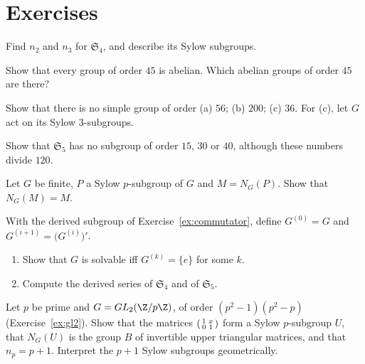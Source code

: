 \section{Exercises}

\begin{exercise}[$\star$]\label{ex:sylowS4}
Find $n_2$ and $n_3$ for $\mathfrak S_4$, and describe its Sylow subgroups.
\end{exercise}

\begin{exercise}[$\star$]\label{ex:order45}
Show that every group of order $45$ is abelian. Which abelian groups of order $45$ are there?
\end{exercise}

\begin{exercise}[$\star$]\label{ex:nosimple}
Show that there is no simple group of order (a) $56$; (b) $200$; (c) $36$. For (c), let $G$ act on its Sylow $3$-subgroups.
\end{exercise}

\begin{exercise}[$\star\star$]\label{ex:S5sub}
Show that $\mathfrak S_5$ has no subgroup of order $15$, $30$ or $40$, although these numbers divide $120$.
\end{exercise}

\begin{exercise}[$\star\star$]\label{ex:normalizer}
Let $G$ be finite, $P$ a Sylow $p$-subgroup of $G$ and $M=N_G(P)$. Show that $N_G(M)=M$.
\end{exercise}

\begin{exercise}[$\star\star$]\label{ex:derived}
With the derived subgroup of Exercise~\ref{ex:commutator}, define $G^{(0)}=G$ and $G^{(i+1)}=\bigl(G^{(i)}\bigr)'$.
\begin{enumerate}[label=(\alph*)]
\item Show that $G$ is solvable iff $G^{(k)}=\{e\}$ for some $k$.
\item Compute the derived series of $\mathfrak S_4$ and of $\mathfrak S_5$.
\end{enumerate}
\end{exercise}

\begin{exercise}[$\star\star$]\label{ex:sylowGL2}
Let $p$ be prime and $G=GL_2(\Z/p\Z)$, of order $(p^2-1)(p^2-p)$ (Exercise~\ref{ex:gl2}). Show that the matrices $\begin{psmallmatrix}1&x\\0&1\end{psmallmatrix}$ form a Sylow $p$-subgroup $U$, that $N_G(U)$ is the group $B$ of invertible upper triangular matrices, and that $n_p=p+1$. Interpret the $p+1$ Sylow subgroups geometrically.
\end{exercise}

